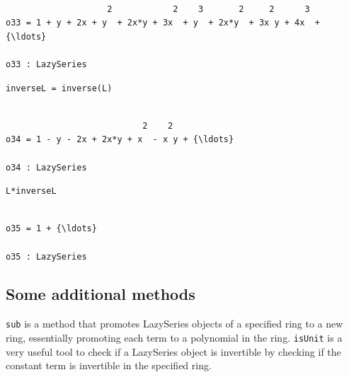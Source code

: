 \documentclass[11pt]{article}
\makeatletter
\newcommand{\boxspacing}{\kern\kvtcb@left@rule\kern\kvtcb@boxsep}
\newcommand{\prompt}[4]{
        {\ttfamily\llap{{\color{#2}[#3]:\hspace{3pt}#4}}\vspace{-\baselineskip}}
    }
\makeatother
\begin{document}
    \begin{Verbatim}[commandchars=\\\{\}]

                    2            2    3       2     2      3
o33 = 1 + y + 2x + y  + 2x*y + 3x  + y  + 2x*y  + 3x y + 4x  + {\ldots}

o33 : LazySeries
    \end{Verbatim}

    \begin{tcolorbox}[breakable, size=fbox, boxrule=1pt, pad at break*=1mm,colback=cellbackground, colframe=cellborder]
\prompt{In}{incolor}{34}{\boxspacing}
\begin{Verbatim}[commandchars=\\\{\}]
inverseL = inverse(L)
\end{Verbatim}
\end{tcolorbox}

    \begin{Verbatim}[commandchars=\\\{\}]

                           2    2
o34 = 1 - y - 2x + 2x*y + x  - x y + {\ldots}

o34 : LazySeries
    \end{Verbatim}

    \begin{tcolorbox}[breakable, size=fbox, boxrule=1pt, pad at break*=1mm,colback=cellbackground, colframe=cellborder]
\prompt{In}{incolor}{35}{\boxspacing}
\begin{Verbatim}[commandchars=\\\{\}]
L*inverseL
\end{Verbatim}
\end{tcolorbox}

    \begin{Verbatim}[commandchars=\\\{\}]

o35 = 1 + {\ldots}

o35 : LazySeries
    \end{Verbatim}

    \hypertarget{some-additional-methods}{%
\subsection{Some additional methods}\label{some-additional-methods}}

\texttt{sub} is a method that promotes LazySeries objects of a specified
ring to a new ring, essentially promoting each term to a polynomial in
the ring. \texttt{isUnit} is a very useful tool to check if a LazySeries
object is invertible by checking if the constant term is invertible in
the specified ring.
\end{document}
